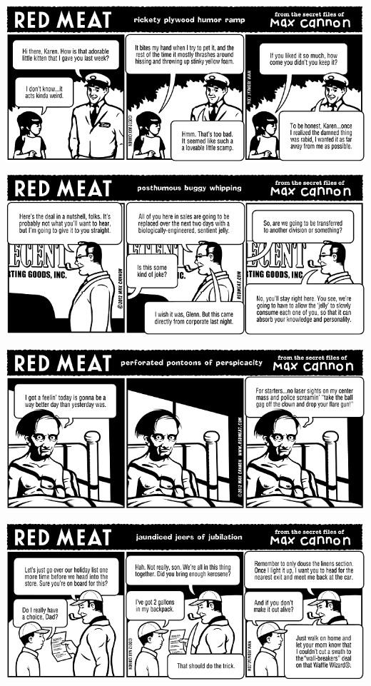 \documentclass[a4paper,twoside,11pt]{article}
\begin{document}
\includegraphics[width=\textwidth]{redmeat_2012-11-13.png}



\includegraphics[width=\textwidth]{redmeat_2012-11-20.png}



\includegraphics[width=\textwidth]{redmeat_2012-11-27.png}



\includegraphics[width=\textwidth]{redmeat_2012-12-04.png}
\end{document}
